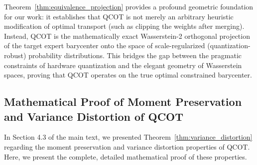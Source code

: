\documentclass{article}
\theoremstyle{plain}
\theoremstyle{definition}
\theoremstyle{remark}
\begin{document}
Theorem~\ref{thm:equivalence_projection} provides a profound geometric foundation for our work: it establishes that QCOT is not merely an arbitrary heuristic modification of optimal transport (such as clipping the weights after merging). Instead, QCOT is the mathematically exact Wasserstein-2 orthogonal projection of the target expert barycenter onto the space of scale-regularized (quantization-robust) probability distributions. This bridges the gap between the pragmatic constraints of hardware quantization and the elegant geometry of Wasserstein spaces, proving that QCOT operates on the true optimal constrained barycenter.

\subsection{Mathematical Proof of Moment Preservation and Variance Distortion of QCOT}
\label{sec:proof_variance_distortion}

In Section 4.3 of the main text, we presented Theorem~\ref{thm:variance_distortion} regarding the moment preservation and variance distortion properties of QCOT. Here, we present the complete, detailed mathematical proof of these properties.
\end{document}
